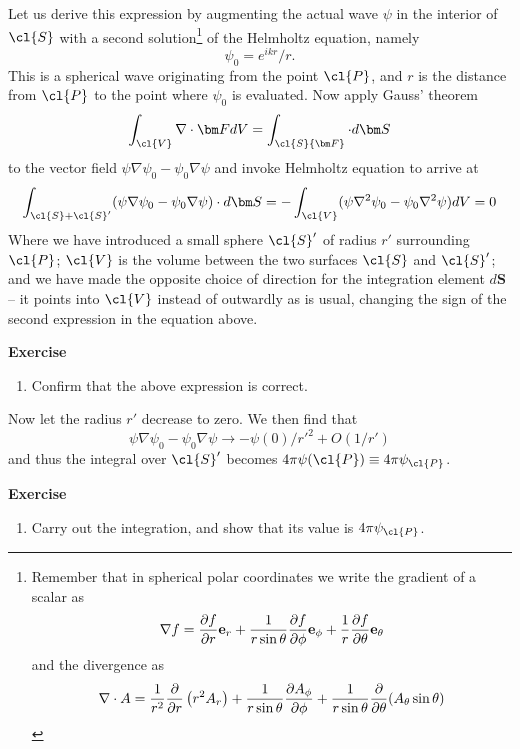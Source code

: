 Let us derive this expression by augmenting the actual wave $\psi$ in the interior of $\cl{S}$
with a second solution\footnote{Remember that in spherical polar coordinates we
write the gradient of a scalar as 
\[
\nabla f={\partial f\over\partial r}{\bf e}_r
     +{1\over r\sin\theta}{\partial f\over\partial\phi}{\bf e}_\phi
     +{1\over r}{\partial f\over\partial\theta}{\bf e}_\theta
\] 
and the divergence as 
\[
{\nabla\cdot A}={1\over r^2}{\partial\over\partial r}\left(r^2A_r\right)
+{1\over r\sin\theta}{\partial A_\phi\over\partial\phi}
+{1\over r\sin\theta}{\partial\over\partial\theta}(A_\theta\sin\theta)
\]} of the Helmholtz equation, namely
\[
\psi_0={e^{ikr}/r}.
\]
This is a spherical wave originating from the point $\cl{P}$, and $r$ is the distance from 
$\cl{P}$ to the point where $\psi_0$ is evaluated. Now apply Gauss' theorem 
\[
\int_\cl{V}\nabla\cdot{\bm F}dV=\int_\cl{S}{\bm F}\cdot d{\bm S}
\]
to the vector field $\psi\nabla\psi_0-\psi_0\nabla\psi$ and invoke Helmholtz equation to 
arrive at 
\[
\int_{\cl{S}+\cl{S}'}(\psi\nabla\psi_0-\psi_0\nabla\psi)\cdot d{\bm S}
           =-\int_\cl{V}(\psi\nabla^2\psi_0-\psi_0\nabla^2\psi)dV=0
\]
Where we have introduced a small sphere $\cl{S}'$ of radius $r'$ surrounding $\cl{P}$; $\cl{V}$
is the volume between the two surfaces $\cl{S}$ and $\cl{S}'$; and we have made the opposite 
choice of direction for the integration element $d{\bm S}$ -- it points into $\cl{V}$ instead
of outwardly as is usual, changing the sign of the second expression in the equation above. 

{\bf Exercise}

\begin{enumerate}
\item Confirm that the above expression is correct.
\setcounter{count}{\value{enumi}} 
\end{enumerate}

Now let the radius $r'$ decrease to zero. We then find that 
\[
\psi\nabla\psi_0-\psi_0\nabla\psi\rightarrow {-\psi(0)/{r'}^2}+O({1/r'})
\]
and thus the integral over $\cl{S}'$ becomes $4\pi\psi(\cl{P})\equiv
4\pi\psi_\cl{P}$. 

{\bf Exercise}

\begin{enumerate}
\setcounter{enumi}{\value{count}}
\item Carry out the integration, and show that its value is $4\pi\psi_{\cl{P}}$.
\setcounter{count}{\value{enumi}} 
\end{enumerate}


